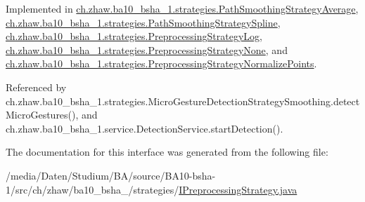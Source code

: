Implemented in \hyperlink{classch_1_1zhaw_1_1ba10__bsha__1_1_1strategies_1_1PathSmoothingStrategyAverage_a1f021ea53245e6ebfa044ca3bb8b0210}{ch.zhaw.ba10\_\-bsha\_\-1.strategies.PathSmoothingStrategyAverage}, \hyperlink{classch_1_1zhaw_1_1ba10__bsha__1_1_1strategies_1_1PathSmoothingStrategySpline_ad3e6346b66b88e50ce7c985ff3d99644}{ch.zhaw.ba10\_\-bsha\_\-1.strategies.PathSmoothingStrategySpline}, \hyperlink{classch_1_1zhaw_1_1ba10__bsha__1_1_1strategies_1_1PreprocessingStrategyLog_a4a22fc4b981ca9898e730579f93744fe}{ch.zhaw.ba10\_\-bsha\_\-1.strategies.PreprocessingStrategyLog}, \hyperlink{classch_1_1zhaw_1_1ba10__bsha__1_1_1strategies_1_1PreprocessingStrategyNone_ac69d173a141370d7fe5c3dd96021a558}{ch.zhaw.ba10\_\-bsha\_\-1.strategies.PreprocessingStrategyNone}, and \hyperlink{classch_1_1zhaw_1_1ba10__bsha__1_1_1strategies_1_1PreprocessingStrategyNormalizePoints_a0b7ffa8b9a2f6d98a2b871fc4afa39f9}{ch.zhaw.ba10\_\-bsha\_\-1.strategies.PreprocessingStrategyNormalizePoints}.

Referenced by ch.zhaw.ba10\_\-bsha\_\-1.strategies.MicroGestureDetectionStrategySmoothing.detectMicroGestures(), and ch.zhaw.ba10\_\-bsha\_\-1.service.DetectionService.startDetection().

The documentation for this interface was generated from the following file:\begin{DoxyCompactItemize}
\item 
/media/Daten/Studium/BA/source/BA10-\/bsha-\/1/src/ch/zhaw/ba10\_\-bsha\_/strategies/\hyperlink{IPreprocessingStrategy_8java}{IPreprocessingStrategy.java}\end{DoxyCompactItemize}
